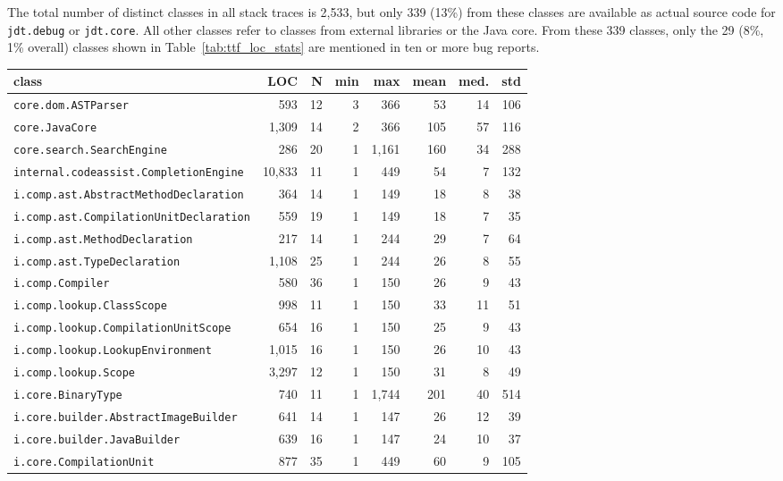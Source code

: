 The total number of distinct classes in all stack traces is 2,533, but only 339 (13\%) from these classes are available as actual source code for \texttt{jdt.debug} or \texttt{jdt.core}. All other classes refer to classes from external libraries or the Java core. From these 339 classes, only the 29 (8\%, 1\% overall) classes shown in Table~\ref{tab:ttf_loc_stats} are mentioned in ten or more bug reports.

\begin{table}[!ht]\footnotesize
	\centering
	\begin{tabular}{lr|rrrrrr}
		\toprule
		class & LOC & N & min & max & mean & med. & std \\
		\midrule
		\verb|core.dom.ASTParser| & 593 & 12 & 3 & 366 & 53 & 14 & 106 \\
		\verb|core.JavaCore| & 1,309 & 14 & 2 & 366 & 105 & 57 & 116 \\
		\verb|core.search.SearchEngine| & 286 & 20 & 1 & 1,161 & 160 & 34 & 288 \\
		\verb|internal.codeassist.CompletionEngine| & 10,833 & 11 & 1 & 449 & 54 & 7 & 132 \\
		\verb|i.comp.ast.AbstractMethodDeclaration| & 364 & 14 & 1 & 149 & 18 & 8 & 38 \\
		\verb|i.comp.ast.CompilationUnitDeclaration| & 559 & 19 & 1 & 149 & 18 & 7 & 35 \\
		\verb|i.comp.ast.MethodDeclaration| & 217 & 14 & 1 & 244 & 29 & 7 & 64 \\
		\verb|i.comp.ast.TypeDeclaration| & 1,108 & 25 & 1 & 244 & 26 & 8 & 55 \\
		\verb|i.comp.Compiler| & 580 & 36 & 1 & 150 & 26 & 9 & 43 \\
		\verb|i.comp.lookup.ClassScope| & 998 & 11 & 1 & 150 & 33 & 11 & 51 \\
		\verb|i.comp.lookup.CompilationUnitScope| & 654 & 16 & 1 & 150 & 25 & 9 & 43 \\
		\verb|i.comp.lookup.LookupEnvironment| & 1,015 & 16 & 1 & 150 & 26 & 10 & 43 \\
		\verb|i.comp.lookup.Scope| & 3,297 & 12 & 1 & 150 & 31 & 8 & 49 \\
		\verb|i.core.BinaryType| & 740 & 11 & 1 & 1,744 & 201 & 40 & 514 \\
		\verb|i.core.builder.AbstractImageBuilder| & 641 & 14 & 1 & 147 & 26 & 12 & 39 \\
		\verb|i.core.builder.JavaBuilder| & 639 & 16 & 1 & 147 & 24 & 10 & 37 \\
		\verb|i.core.CompilationUnit| & 877 & 35 & 1 & 449 & 60 & 9 & 105 \\

\end{tabular}
\end{table}

